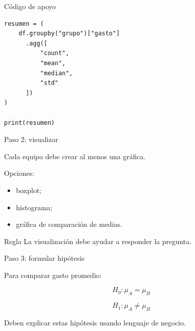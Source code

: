 \documentclass[aspectratio=169,11pt]{beamer}
\begin{document}

\begin{frame}[fragile]{Código de apoyo}

\begin{lstlisting}
resumen = (
    df.groupby("grupo")["gasto"]
      .agg([
          "count",
          "mean",
          "median",
          "std"
      ])
)

print(resumen)
\end{lstlisting}

\end{frame}


\begin{frame}{Paso 2: visualizar}

Cada equipo debe crear al menos una gráfica.

Opciones:

\begin{itemize}

    \item boxplot;

    \item histograma;

    \item gráfica de comparación de medias.

\end{itemize}

\vspace{0.4cm}

\begin{block}{Regla}
La visualización debe ayudar a responder la pregunta.
\end{block}

\end{frame}


\begin{frame}{Paso 3: formular hipótesis}

Para comparar gasto promedio:

\[
H_0:
\mu_A
=
\mu_B
\]

\[
H_1:
\mu_A
\neq
\mu_B
\]

\vspace{0.5cm}

Deben explicar estas hipótesis usando lenguaje de negocio.

\end{frame}
\end{document}
